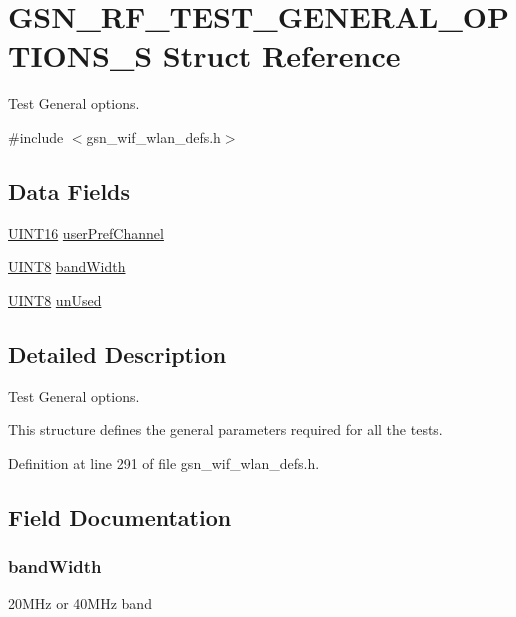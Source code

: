 \hypertarget{a00188}{
\section{GSN\_\-RF\_\-TEST\_\-GENERAL\_\-OPTIONS\_\-S Struct Reference}
\label{a00188}
}


Test General options.  




{\ttfamily \#include $<$gsn\_\-wif\_\-wlan\_\-defs.h$>$}

\subsection*{Data Fields}
\begin{DoxyCompactItemize}
\item 
\hyperlink{a00660_ga09f1a1fb2293e33483cc8d44aefb1eb1}{UINT16} \hyperlink{a00188_aff6f6c2e6a123699448a2850aca96f87}{userPrefChannel}
\item 
\hyperlink{a00660_gab27e9918b538ce9d8ca692479b375b6a}{UINT8} \hyperlink{a00188_a0bc2df517844761d100db608dbe82dfe}{bandWidth}
\item 
\hyperlink{a00660_gab27e9918b538ce9d8ca692479b375b6a}{UINT8} \hyperlink{a00188_a883f58cff3367939239f80a88fc1cff1}{unUsed}
\end{DoxyCompactItemize}


\subsection{Detailed Description}
Test General options. 

This structure defines the general parameters required for all the tests. 

Definition at line 291 of file gsn\_\-wif\_\-wlan\_\-defs.h.



\subsection{Field Documentation}
\hypertarget{a00188_a0bc2df517844761d100db608dbe82dfe}{
\subsubsection[{bandWidth}]{ {\bf bandWidth}}}
\label{a00188_a0bc2df517844761d100db608dbe82dfe}
20MHz or 40MHz band 

